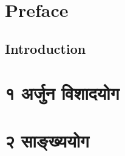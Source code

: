 \documentclass[12pt,twoside,openright,a5paper]{book}
\date{} %
\begin{document}




\thispagestyle{empty}
\frontmatter

\doublespacing
\tableofcontents
\singlespacing

\thispagestyle{empty}
\thispagestyle{empty}
\pagestyle{fancy}


\chapter{Preface}

\begin{onehalfspace}
\chapter{Introduction}

\end{onehalfspace}
\mainmatter
{}
\chapter{\devfont १ अर्जुन विशादयोग}

\chapter{\devfont २ साङ्ख्ययोग}


%
\makeatletter\@openrightfalse
\printindex

\end{document}
